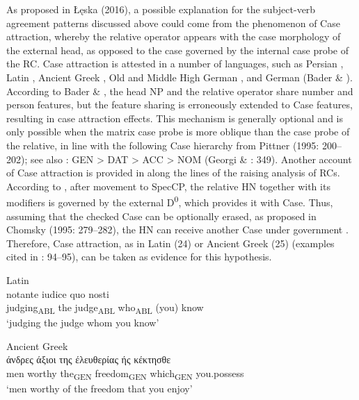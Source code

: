 \documentclass[output=paper]{langsci/langscibook}
\begin{document}
As proposed in Łęska (2016), a possible explanation for the subject-verb agreement patterns discussed above could come from the phenomenon of Case attraction, whereby the relative operator appears with the case morphology of the external head, as opposed to the case governed by the internal case probe of the RC. Case attraction is attested in a number of languages, such as Persian \citep{Aghei2006}, Latin \citep{Bianchi1999}, Ancient Greek \citep{Bianchi1999}, Old and Middle High German \citep{Pittner1995}, and German (Bader \& \citealt{Bayer2006}). According to Bader \& \citet{Bayer2006}, the head NP and the relative operator share number and person features, but the feature sharing is erroneously extended to Case features, resulting in case attraction effects. This mechanism is generally optional and is only possible when the matrix case probe is more oblique than the case probe of the relative, in line with the following Case hierarchy from Pittner (1995: 200–202); see also \citet[122]{Grosu1994}: GEN > DAT > ACC > NOM (Georgi \& \citealt{Salzmann2014}: 349). Another account of Case attraction is provided in \citet{Bianchi1999} along the lines of the raising analysis of RCs. According to \citet{Bianchi1999}, after movement to SpecCP, the relative HN together with its modifiers is governed by the external D\textsuperscript{0}, which provides it with Case. Thus, assuming that the checked Case can be optionally erased, as proposed in Chomsky (1995: 279–282), the HN can receive another Case under government \citep[95]{Bianchi1999}. Therefore, Case attraction, as in Latin (24) or Ancient Greek (25) (examples cited in \citealt{Bianchi1999}: 94–95), can be taken as evidence for this hypothesis. 

\settowidth{}
\ea%
         Latin\label{ex:leska:24}\\
    \gll notante   iudice   quo     nosti        \\
         judging\textsubscript{ABL}   the judge\textsubscript{ABL}   who\textsubscript{ABL}   (you) know       \\
    \glt ‘judging the judge whom you know’ 
\z

\ea%
    Ancient Greek\label{ex:leska:25}\\
    \gll άνδρες 	άξιοι  	της 	έλευθερίας 	ής 	κέκτησθε\\
             men   worthy   the\textsubscript{GEN}   freedom\textsubscript{GEN}   which\textsubscript{GEN} you.possess  \\
    \glt  ‘men worthy of the freedom that you enjoy’         
\z
\end{document}
